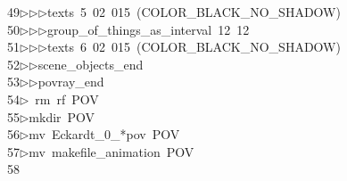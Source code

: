 \begin{tabbing}
49\>$\triangleright$\>$\triangleright$\>$\triangleright$\>texts\ 5\ 02\ 015\ (COLOR\_BLACK\_NO\_SHADOW)\ \\[0pt]
50\>$\triangleright$\>$\triangleright$\>$\triangleright$\>group\_of\_things\_as\_interval\ 12\ 12\ \\[0pt]
51\>$\triangleright$\>$\triangleright$\>$\triangleright$\>texts\ 6\ 02\ 015\ (COLOR\_BLACK\_NO\_SHADOW)\ \\[0pt]
52\>$\triangleright$\>$\triangleright$\>scene\_objects\_end\ \\[0pt]
53\>$\triangleright$\>$\triangleright$\>povray\_end\\[0pt]
54\>$\triangleright$\>\ rm\ rf\ POV\\[0pt]
55\>$\triangleright$\>mkdir\ POV\\[0pt]
56\>$\triangleright$\>mv\ Eckardt\_0\_*pov\ POV\\[0pt]
57\>$\triangleright$\>mv\ makefile\_animation\ POV\\[0pt]
58\>\end{tabbing}

